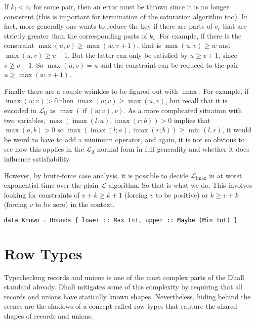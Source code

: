 \documentclass[11pt, twoside, reqno]{book}
\DeclareMathOperator{\imax}{imax}
\DeclareMathOperator{\ifop}{if}
\begin{document}
If \(k_i < v_i\) for some pair, then an error must be thrown since it is no longer consistent (this is important for termination of the saturation algorithm too).
In fact, more generally one wants to reduce the key if there are parts of \(v_i\) that are strictly greater than the corresponding parts of \(k_i\).
For example, if there is the constraint \(\max(u, v) \ge \max(w, v+1)\), that is \(\max(u, v) \ge w\) and \(\max(u, v) \ge v+1\).
But the latter can only be satisfied by \(u \ge v+1\), since \(v \ngeq v+1\).
So \(\max(u, v) = u\) and the constraint can be reduced to the pair \(u \ge \max(w, v+1)\).

Finally there are a couple wrinkles to be figured out with \(\imax\).
For example, if \(\imax(u; v) > 0\) then \(\imax(u; v) \ge \max(u, v)\), but recall that it is encoded in \(\mathcal{L}_{\ifop}\) as \(\max(\ifop(u; v), v)\).
As a more complicated situation with two variables, \(\max(\imax(l; a), \imax(r; b)) > 0\) implies that \(\max(a, b) > 0\) so \(\max(\imax(l; a), \imax(r; b)) \ge \min(l, r)\), it would be weird to have to add a minimum operator, and again, it is not so obvious to see how this applies in the \(\mathcal{L}_{\ifop}\) normal form in full generality and whether it does influence satisfiability.

However, by brute-force case analysis, it is possible to decide \(\mathcal{L}_{\imax}\) in at worst exponential time over the plain \(\mathcal{L}\) algorithm.
So that is what we do.
This involves looking for constraints of \(v+k \ge k+1\) (forcing \(v\) to be positive) or \(k \ge v+k\) (forcing \(v\) to be zero) in the context.

\begin{verbatim}
data Known = Bounds { lower :: Max Int, upper :: Maybe (Min Int) }
\end{verbatim}







\chapter{Row Types}
Typechecking records and unions is one of the most complex parts of the Dhall standard already.
Dhall mitigates some of this complexity by requiring that all records and unions have statically known shapes.
Nevertheless, hiding behind the scenes are the shadows of a concept called row types that capture the shared shapes of records and unions.
\end{document}
